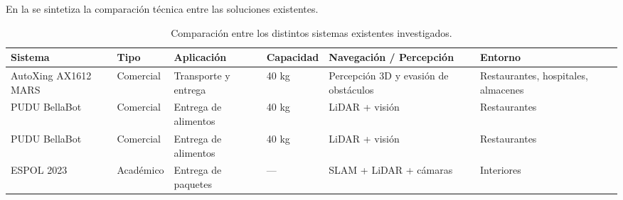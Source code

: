 En la  se sintetiza la comparación técnica entre las soluciones existentes.

\begin{table}[htbp]
    \centering
    \caption{Comparación entre los distintos sistemas existentes investigados.}
    \label{tab:comparativa_eda}
    \begin{tabularx}{\textwidth}{p{2.5cm} p{1.8cm} X p{1.8cm} X p{2.0cm}}
        \toprule
        \textbf{Sistema} & \textbf{Tipo} & \textbf{Aplicación} & \textbf{Capacidad} & \textbf{Navegación / Percepción} & \textbf{Entorno} \\
        \midrule
        AutoXing AX1612 MARS & Comercial & Transporte y entrega & 40 kg & Percepción 3D y evasión de obstáculos & Restaurantes, hospitales, almacenes \\
        PUDU BellaBot & Comercial & Entrega de alimentos & 40 kg & LiDAR + visión & Restaurantes \\
        PUDU BellaBot & Comercial & Entrega de alimentos & 40 kg & LiDAR + visión & Restaurantes \\
        ESPOL 2023 & Académico & Entrega de paquetes & — & SLAM + LiDAR + cámaras & Interiores \\        
        \bottomrule
    \end{tabularx}
\end{table}

\noindent